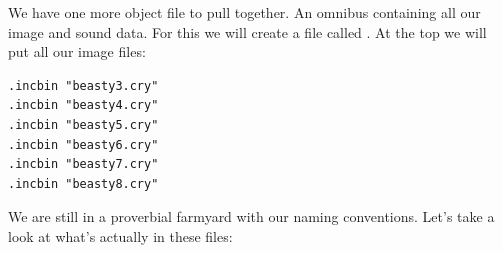 We have one more object file to pull together. An omnibus containing all our image and sound data. For this
we will create a file called . At the top we will put all our image files:

\begin{lstlisting}
.incbin "beasty3.cry"
.incbin "beasty4.cry"
.incbin "beasty5.cry"
.incbin "beasty6.cry"
.incbin "beasty7.cry"
.incbin "beasty8.cry"
\end{lstlisting}

We are still in a proverbial farmyard with our naming conventions. Let's take a look at what's actually in these files:

\begin{figure}[H]
  {
    \setlength{\tabcolsep}{3.0pt}
    \setlength\cmidrulewidth{\heavyrulewidth} %
    \begin{adjustbox}{width=10cm,center}


\end{adjustbox}}
\end{figure}
